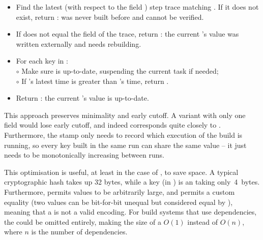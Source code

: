 \begin{itemize}
\item Find the latest (with respect to the field ) step trace matching
  . If it does not exist, return :  was never built
  before and cannot be verified.
\item If  does not equal the  field of the trace, return
  : the current 's value was written externally and needs
  rebuilding.
\item For each key  in :\\
  $\circ$ Make sure  is up-to-date, suspending the current task if needed;\\
  $\circ$ If 's latest  time is greater than 's
     time, return .
\item Return : the current 's value is up-to-date.
\end{itemize}

\noindent
This approach preserves minimality and early cutoff. A variant with only one
 field would lose early cutoff, and indeed corresponds quite closely to
\Make. Furthermore, the  stamp only needs to record which execution of
the build is running, so every key built in the same run can share the same
 value -- it just needs to be monotonically increasing between runs.

This optimisation is useful, at least in the case of \Shake, to save space. A
typical cryptographic hash takes up 32 bytes, while a key (in \Shake) is an
 taking only~4~bytes. Furthermore, \Shake permits values to be
arbitrarily large, and permits a custom equality (two values can be bit-for-bit
unequal but considered equal by \Shake), meaning that a  is not a valid
encoding. For build systems that use  dependencies, the
 could be omitted entirely, making the size of a 
$O(1)$ instead of $O(n)$, where $n$ is the number of dependencies.

